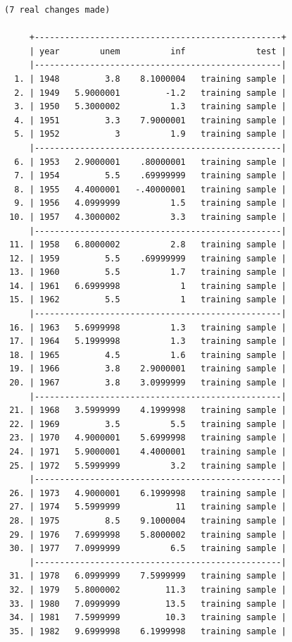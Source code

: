 \documentclass[
]{book}
\begin{document}
\begin{verbatim}
(7 real changes made)

     +-------------------------------------------------+
     | year        unem          inf              test |
     |-------------------------------------------------|
  1. | 1948         3.8    8.1000004   training sample |
  2. | 1949   5.9000001         -1.2   training sample |
  3. | 1950   5.3000002          1.3   training sample |
  4. | 1951         3.3    7.9000001   training sample |
  5. | 1952           3          1.9   training sample |
     |-------------------------------------------------|
  6. | 1953   2.9000001    .80000001   training sample |
  7. | 1954         5.5    .69999999   training sample |
  8. | 1955   4.4000001   -.40000001   training sample |
  9. | 1956   4.0999999          1.5   training sample |
 10. | 1957   4.3000002          3.3   training sample |
     |-------------------------------------------------|
 11. | 1958   6.8000002          2.8   training sample |
 12. | 1959         5.5    .69999999   training sample |
 13. | 1960         5.5          1.7   training sample |
 14. | 1961   6.6999998            1   training sample |
 15. | 1962         5.5            1   training sample |
     |-------------------------------------------------|
 16. | 1963   5.6999998          1.3   training sample |
 17. | 1964   5.1999998          1.3   training sample |
 18. | 1965         4.5          1.6   training sample |
 19. | 1966         3.8    2.9000001   training sample |
 20. | 1967         3.8    3.0999999   training sample |
     |-------------------------------------------------|
 21. | 1968   3.5999999    4.1999998   training sample |
 22. | 1969         3.5          5.5   training sample |
 23. | 1970   4.9000001    5.6999998   training sample |
 24. | 1971   5.9000001    4.4000001   training sample |
 25. | 1972   5.5999999          3.2   training sample |
     |-------------------------------------------------|
 26. | 1973   4.9000001    6.1999998   training sample |
 27. | 1974   5.5999999           11   training sample |
 28. | 1975         8.5    9.1000004   training sample |
 29. | 1976   7.6999998    5.8000002   training sample |
 30. | 1977   7.0999999          6.5   training sample |
     |-------------------------------------------------|
 31. | 1978   6.0999999    7.5999999   training sample |
 32. | 1979   5.8000002         11.3   training sample |
 33. | 1980   7.0999999         13.5   training sample |
 34. | 1981   7.5999999         10.3   training sample |
 35. | 1982   9.6999998    6.1999998   training sample |

\end{verbatim}
\end{document}
